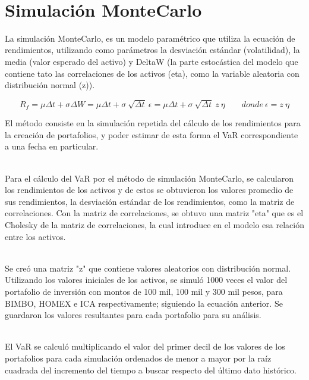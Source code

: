 \documentclass[12pt]{article}
\begin{document}
\ \\%

\section{Simulación MonteCarlo}

La simulación MonteCarlo, es un modelo paramétrico que utiliza la ecuación de rendimientos, utilizando como parámetros la desviación estándar (volatilidad), la media (valor esperado del activo) y DeltaW (la parte estocástica del modelo que contiene tato las correlaciones de los activos (eta), como la variable aleatoria con distribución normal (z)).

$$ R_{f}= \mu\Delta t + \sigma\Delta W  = \mu\Delta t + \sigma \: \sqrt{\Delta t} \: \epsilon = \mu\Delta t + \sigma  \: \sqrt{\Delta t} \: z \: \eta \: \: \: \: \: \: \: \: \: donde \: \epsilon = z \: \eta$$

El método consiste en la simulación repetida del cálculo de los rendimientos para la creación de portafolios, y poder estimar de esta forma el VaR correspondiente a una fecha en particular.

\ \\%
Para el cálculo del VaR por el método de simulación MonteCarlo, se calcularon los rendimientos de los activos y de estos se obtuvieron los valores promedio de sus rendimientos, la desviación estándar de los rendimientos, como la matriz de correlaciones. Con la matriz de correlaciones, se obtuvo una matriz "eta" que es el Cholesky de la matriz de correlaciones, la cual introduce en el modelo esa relación entre los activos. 

\ \\%
Se creó una matriz "z" que contiene valores aleatorios con distribución normal. Utilizando los valores iniciales de los activos, se simuló 1000 veces el valor del portafolio de inversión con montos de 100 mil, 100 mil y 300 mil pesos, para BIMBO, HOMEX e ICA respectivamente; siguiendo la ecuación anterior. Se guardaron los valores resultantes para cada portafolio para su análisis.

\ \\%
El VaR se calculó multiplicando el valor del primer decil de los valores de los portafolios para cada simulación ordenados de menor a mayor por la raíz cuadrada del incremento del tiempo a buscar respecto del último dato histórico.
\end{document}
